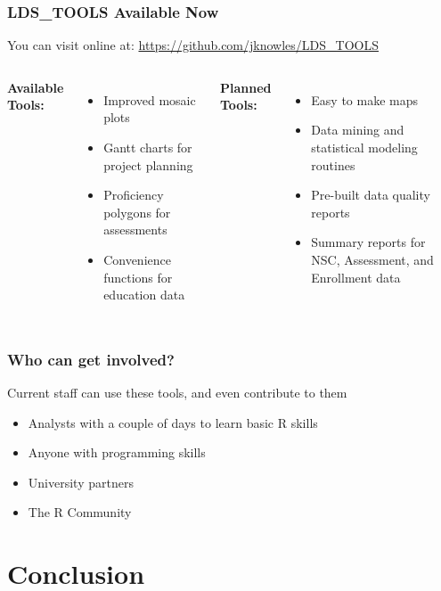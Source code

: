 \documentclass{beamer}
\begin{document}
\begin{frame}
\frametitle{LDS\_TOOLS Available Now}
You can visit online at: \textcolor{blue}{\href{https://github.com/jknowles/LDS_TOOLS}{https://github.com/jknowles/LDS\_TOOLS}}
\vspace{.1in}
\begin{columns}
  \textbf{Available Tools:}
    \begin{itemize}
      \item Improved mosaic plots
      \item Gantt charts for project planning
      \item Proficiency polygons for assessments
      \item Convenience functions for education data
    \end{itemize}
  \textbf{Planned Tools:}
    \begin{itemize}
      \item Easy to make maps
      \item Data mining and statistical modeling routines
      \item Pre-built data quality reports
      \item Summary reports for NSC, Assessment, and Enrollment data
    \end{itemize}
\end{columns}
\end{frame}


\begin{frame}
\frametitle{Who can get involved?}
\Large Current staff can use these tools, and even contribute to them
\normalsize
\begin{itemize}
  \item Analysts with a couple of days to learn basic R skills
  \item Anyone with programming skills
  \item University partners
  \item The R Community
\end{itemize}
\end{frame}

\section{Conclusion}
\end{document}
